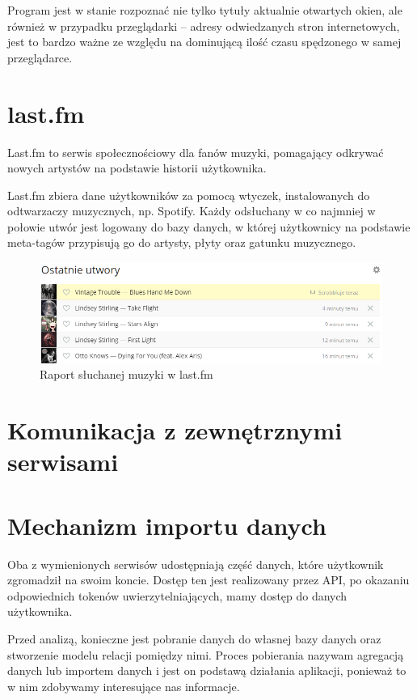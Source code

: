\documentclass[brudnopis]{xmgr}
\begin{document}
        Program jest w stanie rozpoznać nie tylko tytuły aktualnie otwartych okien,
        ale również w przypadku przeglądarki – adresy odwiedzanych stron internetowych,
        jest to bardzo ważne ze względu na dominującą ilość czasu spędzonego w samej przeglądarce.

        \section*{last.fm}

        Last.fm to serwis społecznościowy dla fanów muzyki,
        pomagający odkrywać nowych artystów na podstawie historii użytkownika.

        Last.fm zbiera dane użytkowników za pomocą wtyczek, instalowanych do odtwarzaczy muzycznych, np. Spotify.
        Każdy odsłuchany w co najmniej w połowie utwór jest logowany do bazy danych,
        w której użytkownicy na podstawie meta-tagów przypisują go do artysty, płyty oraz gatunku muzycznego.

        \begin{figure}
          \includegraphics[width=\linewidth]{fig/lastfm-now-listening.png}
          \caption{Raport słuchanej muzyki w last.fm}
          \label{fig:Last.fm}
        \end{figure}

        \section*{Komunikacja z zewnętrznymi serwisami}

    \section{Mechanizm importu danych}

        Oba z wymienionych serwisów udostępniają część danych, które użytkownik zgromadził na swoim koncie.
        Dostęp ten jest realizowany przez API, po okazaniu odpowiednich tokenów uwierzytelniających, mamy dostęp do danych użytkownika.

        Przed analizą, konieczne jest pobranie danych do własnej bazy danych oraz stworzenie modelu relacji pomiędzy nimi.
        Proces pobierania nazywam agregacją danych lub importem danych i jest on podstawą działania aplikacji,
        ponieważ to w nim zdobywamy interesujące nas informacje.
\end{document}
